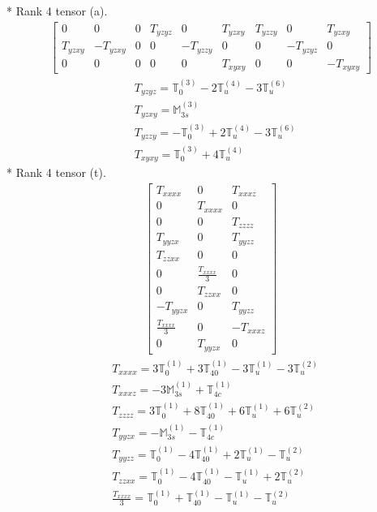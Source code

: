 \documentclass[fleqn,8pt,landscape]{jsarticle}
\begin{document}
* Rank 4 tensor (a).
\begin{align*}
\begin{bmatrix} 0 & 0 & 0 & T_{yzyz} & 0 & T_{yzxy} & T_{yzzy} & 0 & T_{yzxy} \\ T_{yzxy} & - T_{yzxy} & 0 & 0 & - T_{yzzy} & 0 & 0 & - T_{yzyz} & 0 \\ 0 & 0 & 0 & 0 & 0 & T_{xyxy} & 0 & 0 & - T_{xyxy} \end{bmatrix}
\end{align*}
\begin{align*}
& T_{yzyz} = \mathbb{T}_{0}^{(3)} - 2 \mathbb{T}_{u}^{(4)} - 3 \mathbb{T}_{u}^{(6)} \\
& T_{yzxy} = \mathbb{M}_{3s}^{(3)} \\
& T_{yzzy} = - \mathbb{T}_{0}^{(3)} + 2 \mathbb{T}_{u}^{(4)} - 3 \mathbb{T}_{u}^{(6)} \\
& T_{xyxy} = \mathbb{T}_{0}^{(3)} + 4 \mathbb{T}_{u}^{(4)}
\end{align*}
* Rank 4 tensor (t).
\begin{align*}
\begin{bmatrix} T_{xxxx} & 0 & T_{xxxz} \\ 0 & T_{xxxx} & 0 \\ 0 & 0 & T_{zzzz} \\ T_{yyzx} & 0 & T_{yyzz} \\ T_{zzxx} & 0 & 0 \\ 0 & \frac{T_{xxxx}}{3} & 0 \\ 0 & T_{zzxx} & 0 \\ - T_{yyzx} & 0 & T_{yyzz} \\ \frac{T_{xxxx}}{3} & 0 & - T_{xxxz} \\ 0 & T_{yyzx} & 0 \end{bmatrix}
\end{align*}
\begin{align*}
& T_{xxxx} = 3 \mathbb{T}_{0}^{(1)} + 3 \mathbb{T}_{40}^{(1)} - 3 \mathbb{T}_{u}^{(1)} - 3 \mathbb{T}_{u}^{(2)} \\
& T_{xxxz} = - 3 \mathbb{M}_{3s}^{(1)} + \mathbb{T}_{4c}^{(1)} \\
& T_{zzzz} = 3 \mathbb{T}_{0}^{(1)} + 8 \mathbb{T}_{40}^{(1)} + 6 \mathbb{T}_{u}^{(1)} + 6 \mathbb{T}_{u}^{(2)} \\
& T_{yyzx} = - \mathbb{M}_{3s}^{(1)} - \mathbb{T}_{4c}^{(1)} \\
& T_{yyzz} = \mathbb{T}_{0}^{(1)} - 4 \mathbb{T}_{40}^{(1)} + 2 \mathbb{T}_{u}^{(1)} - \mathbb{T}_{u}^{(2)} \\
& T_{zzxx} = \mathbb{T}_{0}^{(1)} - 4 \mathbb{T}_{40}^{(1)} - \mathbb{T}_{u}^{(1)} + 2 \mathbb{T}_{u}^{(2)} \\
& \frac{T_{xxxx}}{3} = \mathbb{T}_{0}^{(1)} + \mathbb{T}_{40}^{(1)} - \mathbb{T}_{u}^{(1)} - \mathbb{T}_{u}^{(2)}
\end{align*}
\end{document}

